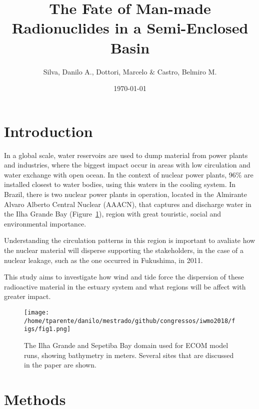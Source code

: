 \documentclass[final]{beamer}
\title
[10th International Workshop on Modeling the Ocean] %
{ %
The Fate of Man-made Radionuclides in a Semi-Enclosed Basin
}
\author{ Silva, Danilo A.\inst{1}, Dottori, Marcelo\inst{2} $\&$ Castro, Belmiro M.\inst{3} 
}
\institute[Instituto Oceanográfico - Universidade de São Paulo]
{
Oceanographic Institute of the University of São Paulo\\ [0.2ex]
\inst{1} danilo2.silva@usp.br; \inst{2} mdottori@usp.br; \inst{3} bmcastro@usp.br
}
\date{\today}
\begin{document}
\begin{frame}
\begin{multicols}{2}

\section{Introduction}

In a global scale, water reservoirs are used to dump material from power plants and
industries, where the biggest impact occur in areas with low circulation and water
exchange with open ocean. In the context of nuclear power plants, 96$\%$ are installed
closest to water bodies, using this waters in the cooling system. In Brazil, there is
two nuclear power plants in operation, located in the Almirante Alvaro Alberto 
Central Nuclear (AAACN), that captures and discharge water in the Ilha Grande Bay
(Figure~\ref{fig:areaestudo}), region with great touristic, social and environmental importance.

Understanding the circulation patterns in this region is important to avaliate how the nuclear
material will disperse supporting the stakeholders, in the case of a nuclear leakage, such
as the one occurred in Fukushima, in 2011.

This study aims to investigate how wind and tide force the dispersion of these radioactive material in the
estuary system and what regions will be affect with greater impact.

\vspace{.1in}
\begin{figure}
\centering
\texttt{[image: /home/tparente/danilo/mestrado/github/congressos/iwmo2018/figs/fig1.png]}
\vspace{.1in}
\caption{The Ilha Grande and Sepetiba Bay domain used for ECOM model runs, showing bathymetry in meters. Several sites that are discussed in the paper are shown.}
\label{fig:areaestudo}
\end{figure}
\vspace{-.5in}
\section{Methods}


\end{multicols}
\end{frame}
\end{document}
